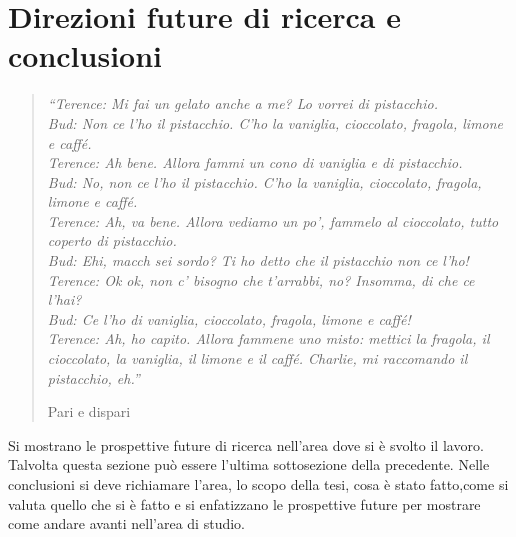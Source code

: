 \chapter{Direzioni future di ricerca e conclusioni}
\label{capitolo7}
\thispagestyle{empty}

\begin{quotation}
{\footnotesize
\noindent\emph{``Terence: Mi fai un gelato anche a me? Lo vorrei di pistacchio. \\
Bud: Non ce l'ho il pistacchio. C'ho la vaniglia, cioccolato, fragola, limone e caff\'e. \\
Terence: Ah bene. Allora fammi un cono di vaniglia e di pistacchio. \\
Bud: No, non ce l'ho il pistacchio. C'ho la vaniglia, cioccolato, fragola, limone e caff\'e. \\
Terence: Ah, va bene. Allora vediamo un po', fammelo al cioccolato, tutto coperto di pistacchio. \\
Bud: Ehi, macch sei sordo? Ti ho detto che il pistacchio non ce l'ho! \\
Terence: Ok ok, non c' bisogno che t'arrabbi, no? Insomma, di che ce l'hai? \\
Bud: Ce l'ho di vaniglia, cioccolato, fragola, limone e caff\'e! \\
Terence: Ah, ho capito. Allora fammene uno misto: mettici la fragola, il cioccolato, la vaniglia, il limone e il caff\'e. Charlie, mi raccomando il pistacchio, eh.''}
\begin{flushright}
Pari e dispari
\end{flushright}
}
\end{quotation}
\vspace{0.5cm}

\noindent Si mostrano le prospettive future di ricerca nell'area dove si \`e svolto il lavoro. Talvolta questa sezione pu\`o essere l'ultima sottosezione della precedente. Nelle conclusioni si deve richiamare l'area, lo scopo della tesi, cosa \`e stato fatto,come si valuta quello che si \`e fatto e si enfatizzano le prospettive future per mostrare come andare avanti nell'area di studio.